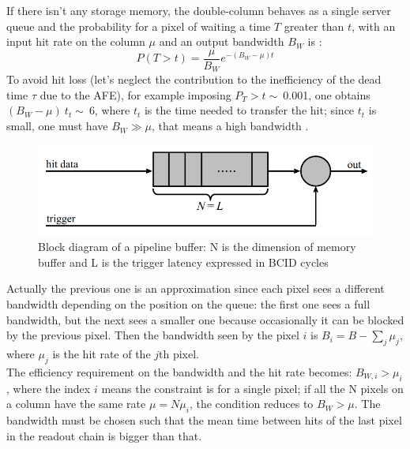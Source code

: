    If there isn't any storage memory, the double-column behaves as a single server queue and the probability for a pixel of waiting a time $T$ greater than $t$, with an input hit rate on the column $\mu$ and an output bandwidth $B_W$ is \cite{Garcia-Review}:
   \begin{equation}
   P(T > t) = \frac{\mu}{B_W} e^{-( B_W-\mu )t}
   \label{eq:priority_chain_no_buffer}
   \end{equation}
   To avoid hit loss (let's neglect the contribution to the inefficiency of the dead time $\tau$ due to the AFE), for example imposing $P_T > t\sim\:$0.001, one obtains $(B_W -\mu)\:t_t\sim\:$6, where $t_t$ is the time needed to transfer the hit; since $t_t$ is small, one must have $B_W \gg \mu$, that means a high bandwidth \cite{Garcia-Review}.
   \begin{figure}[h!]
      \centering
      \includegraphics[width=.6\linewidth]{figures/Pixel_detectors/pipeline.png}
      \caption{Block diagram of a pipeline buffer: N is the dimension of memory buffer and L is the trigger latency expressed in BCID cycles}
      \label{fig:pipeline}
   \end{figure}

   Actually the previous one is an approximation since each pixel sees a different bandwidth depending on the position on the queue: the first one sees a full bandwidth, but the next sees a smaller one because occasionally it can be blocked by the previous pixel. Then the bandwidth seen by the pixel $i$ is $B_{i} = B - \sum _{j}\mu_{j}$, where $\mu_j$ is the hit rate of the $j$th pixel.\\
   The efficiency requirement on the bandwidth and the hit rate becomes: $B_{W,i} > \mu_{i}$, where the index $i$ means the constraint is for a single pixel; if all the N pixels on a column have the same rate $\mu = N\mu_{i}$, the condition reduces to $B_{W} > \mu$.
   The bandwidth must be chosen such that the mean time between hits of the last pixel in the readout chain is bigger than that.\\

